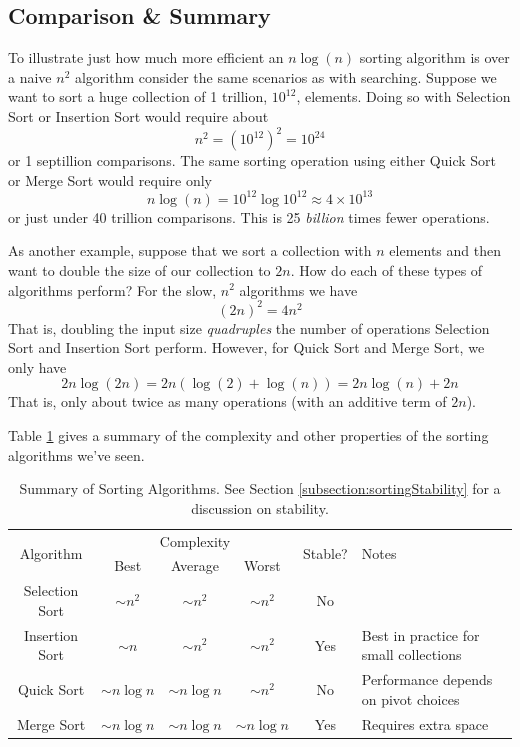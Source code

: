 \subsection{Comparison \& Summary}

To illustrate just how much more efficient an $n\log{(n)}$ sorting algorithm
is over a naive $n^2$ algorithm consider the same scenarios as with searching.
Suppose we want to sort a huge collection of 1 trillion, $10^{12}$, elements.
Doing so with Selection Sort or Insertion Sort would require about 
  $$n^2 = (10^{12})^2 = 10^{24}$$
or 1 septillion comparisons.  The same sorting operation using either
Quick Sort or Merge Sort would require only
  $$n\log{(n)} = 10^{12} \log{10^{12}} \approx 4 \times 10^{13}$$
or just under 40 trillion comparisons.  This is 25 \emph{billion} times
fewer operations.  

As another example, suppose that we sort a collection with $n$ elements
and then want to double the size of our collection to $2n$.  How do each
of these types of algorithms perform?  For the slow, $n^2$ algorithms we
have 
  $$(2n)^2 = 4n^2$$
That is, doubling the input size \emph{quadruples} the number of operations
Selection Sort and Insertion Sort perform.  However, for Quick Sort and
Merge Sort, we only have
  $$2n \log{(2n)} = 2n\left( \log{(2)} + \log{(n)}\right) = 2n\log{(n)} + 2n$$
That is, only about twice as many operations (with an additive term of $2n$).

Table \ref{table:sortingSummary} gives a summary of the complexity and other
properties of the sorting algorithms we've seen.

\begin{table}[h]
\centering
\begin{tabular}{|c|c|c|c|c|p{5cm}|}
\hline
\multirow{2}{*}{Algorithm} & \multicolumn{3}{|c|}{Complexity} & \multirow{2}{*}{Stable?} & \multirow{2}{*}{Notes} \\ \cline{2-4}
~ & Best & Average & Worst & ~ & ~ \\
\hline
Selection Sort & $\sim n^2$ & $\sim n^2$ & $\sim n^2$ & No & \\
\hline
Insertion Sort & $\sim n$ & $\sim n^2$ & $\sim n^2$ & Yes & Best in practice for small collections\\
\hline
Quick Sort & $\sim n\log{n}$ & $\sim n\log{n}$ & $\sim n^2$ & No & Performance depends on pivot choices\\
\hline
Merge Sort & $\sim n\log{n}$ & $\sim n\log{n}$ & $\sim n\log{n}$ & Yes & Requires extra space \\
\hline
\end{tabular}
\caption{Summary of Sorting Algorithms.  See Section
\ref{subsection:sortingStability} for a discussion on stability.}
\label{table:sortingSummary}
\end{table}

